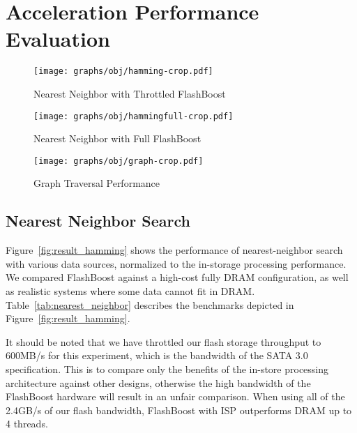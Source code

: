 \section{Acceleration Performance Evaluation}
\label{sec:results_acceleration}

\begin{figure*}[ht]
\centering
\vspace{0pt}
\begin{minipage}[c]{.3\textwidth}
	\texttt{[image: graphs/obj/hamming-crop.pdf]}
	\caption{Nearest Neighbor with Throttled FlashBoost}
	\label{fig:result_hamming}
\end{minipage}\hfill
\vspace{0pt}
\begin{minipage}[c]{.3\textwidth}
	\texttt{[image: graphs/obj/hammingfull-crop.pdf]}
	\caption{Nearest Neighbor with Full FlashBoost}
	\label{fig:result_hammingfull}
\end{minipage}\hfill
\vspace{0pt}
\begin{minipage}[c]{.3\textwidth}
	\texttt{[image: graphs/obj/graph-crop.pdf]}
	\caption{Graph Traversal Performance}
	\label{fig:result_graph}
\end{minipage}
\end{figure*}

\subsection{Nearest Neighbor Search}

Figure~\ref{fig:result_hamming} shows the performance of nearest-neighbor search
with various data sources, normalized to the in-storage processing performance.
We compared FlashBoost against a high-cost fully DRAM configuration, as well as
realistic systems where some data cannot fit in DRAM.
Table~\ref{tab:nearest_neighbor} describes the benchmarks depicted in
Figure~\ref{fig:result_hamming}.

It should be noted that we have throttled our flash storage throughput to
600MB/s for this experiment, which is the bandwidth of the SATA 3.0
specification. This is to compare only the benefits of the in-store processing
architecture against other designs, otherwise the high bandwidth of the
FlashBoost hardware will result in an unfair comparison. When using all of the
2.4GB/s of our flash bandwidth, FlashBoost with ISP outperforms DRAM up to 4 threads.

